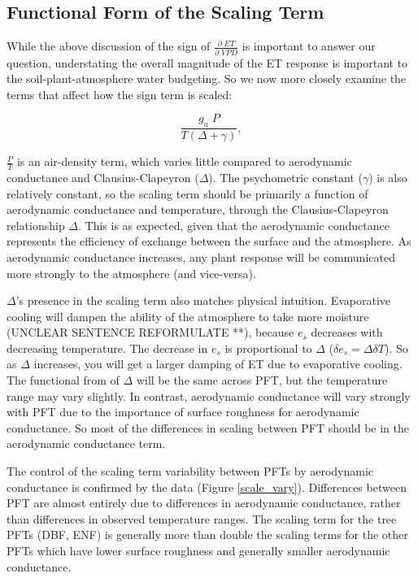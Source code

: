 \documentclass[draft,linenumbers]{agujournal}
\begin{document}
\subsection{Functional Form of the Scaling Term}
\label{scale_term}
While the above discussion of the sign of $\frac{\partial \; ET}{\partial \; VPD}$ is important to answer our question, understating the overall magnitude of the ET response is important to the soil-plant-atmosphere water budgeting. So we now more closely examine the terms that affect how the sign term is scaled:

\begin{equation}
  \frac{g_a \; P}{T(\Delta + \gamma)},
\end{equation}

$\frac{P}{T}$ is an air-density term, which varies little compared to aerodynamic conductance and Clausius-Clapeyron ($\Delta$). The psychometric constant ($\gamma$) is also relatively constant, so the scaling term should be primarily a function of aerodynamic conductance and temperature, through the Clausius-Clapeyron relationship $\Delta$. This is as expected, given that the aerodynamic conductance represents the efficiency of exchange between the surface and the atmosphere. As aerodynamic conductance  increases, any plant response will be communicated more strongly to the atmosphere (and vice-versa).

$\Delta$'s presence in the scaling term also matches physical intuition. Evaporative cooling will dampen the ability of the atmosphere to take more moisture (UNCLEAR SENTENCE REFORMULATE **), because $e_{s}$ decreases with decreasing temperature. The decrease in $e_{s}$ is proportional to $\Delta$ ($\delta e_{s} = \Delta \delta T$). So as $\Delta$ increases, you will get a larger damping of ET due to evaporative cooling. The functional from of $\Delta$ will be the same across PFT, but the temperature range may vary slightly. In contrast, aerodynamic conductance will vary strongly with PFT due to the importance of surface roughness for aerodynamic conductance. So most of the differences in scaling between PFT should be in the aerodynamic conductance term. 

The control of the scaling term variability between PFTs by aerodynamic conductance is confirmed by the data (Figure \ref{scale_vary}). Differences between PFT are almost entirely due to differences in aerodynamic conductance, rather than differences in observed temperature ranges. The scaling term for the tree PFTs (DBF, ENF) is generally more than double the scaling terms for the other PFTs which have lower surface roughness and generally smaller aerodynamic conductance.
\end{document}
